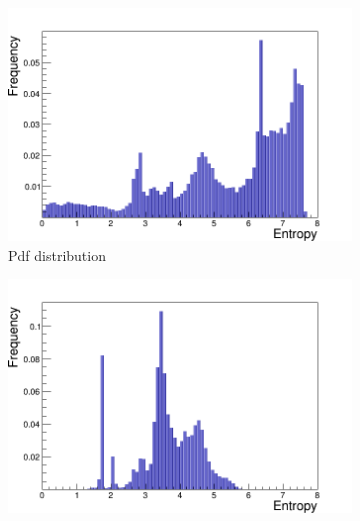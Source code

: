 \begin{figure}[H]
  \begin{subfigure}[b]{.5\linewidth}
    \raggedleft
     \includegraphics[scale=0.33]{./Figures/entropy/Entropy_pdf}
   \caption{Pdf distribution}
    \label{fig:1a}
  \end{subfigure}%
  \begin{subfigure}[b]{.5\linewidth}
    \raggedright
        \includegraphics[scale=0.33]{./Figures/entropy/Entropy_xls}
    \label{fig:1b}
  \end{subfigure}
  

\end{figure}
